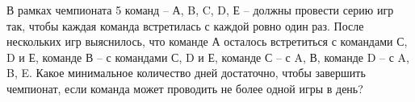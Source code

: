 \question
В рамках чемпионата 5 команд – А, B, C, D, Е – должны провести
серию игр так, чтобы каждая команда встретилась с каждой ровно один раз. После нескольких игр выяснилось, что команде А осталось встретиться с командами  С, D и Е, команде В – с командами С, D и Е, команде С – с A, В, команде D – с A, B, E. Какое минимальное количество дней достаточно, чтобы завершить чемпионат, если команда может проводить не более одной игры в день?
